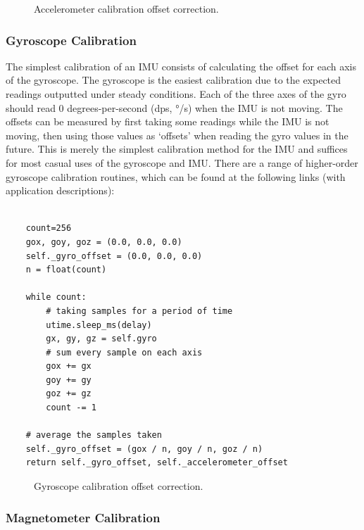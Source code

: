 \begin{figure}[!h]
    \centering
    \resizebox{1\linewidth}{!}{}
    \caption{Accelerometer calibration offset correction.}
\end{figure}

\subsubsection{Gyroscope Calibration}

The simplest calibration of an IMU consists of calculating the offset for each axis of the gyroscope. The gyroscope is the easiest calibration due to the expected readings outputted under steady conditions. Each of the three axes of the gyro should read 0 degrees-per-second (dps, °/s) when the IMU is not moving. The offsets can be measured by first taking some readings while the IMU is not moving, then using those values as ‘offsets’ when reading the gyro values in the future. This is merely the simplest calibration method for the IMU and suffices for most casual uses of the gyroscope and IMU. There are a range of  higher-order gyroscope calibration routines, which can be found at the following links (with application descriptions):

\lstset{language=Python}

\begin{lstlisting}[frame=single]  % Start your code-block

    count=256
    gox, goy, goz = (0.0, 0.0, 0.0)
    self._gyro_offset = (0.0, 0.0, 0.0) 
    n = float(count)

    while count:
        # taking samples for a period of time
        utime.sleep_ms(delay)
        gx, gy, gz = self.gyro
        # sum every sample on each axis
        gox += gx
        goy += gy
        goz += gz
        count -= 1

    # average the samples taken
    self._gyro_offset = (gox / n, goy / n, goz / n)
    return self._gyro_offset, self._accelerometer_offset
\end{lstlisting}

\begin{figure}[!h]
    \centering
    \resizebox{1\linewidth}{!}{}
    \caption{Gyroscope calibration offset correction.}
\end{figure}

\subsubsection{Magnetometer Calibration}

